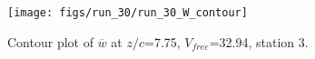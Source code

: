 \begin{figure}[H]
\centering
\texttt{[image: figs/run\_30/run\_30\_W\_contour]}
\caption{Contour plot of $\overline{w}$ at $z/c$=7.75, $V_{free}$=32.94, station 3.}
\label{fig:run_30_W_contour}
\end{figure}


